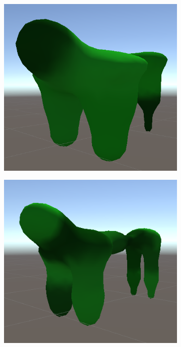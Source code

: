 \begin{figure}[ht]
\begin{subfigure}[b]{0.2\textwidth}
    \end{subfigure}
    \begin{subfigure}[b]{0.2\textwidth}
        \centering        
        \includegraphics[width=\textwidth, height=\textwidth]{resources/img/Finished_Creatures_4/creature_3}
    \end{subfigure}
    \begin{subfigure}[b]{0.2\textwidth}
        \centering
        \includegraphics[width=\textwidth, height=\textwidth]{resources/img/Finished_Creatures_4/creature_4}

\end{subfigure}
\end{figure}
